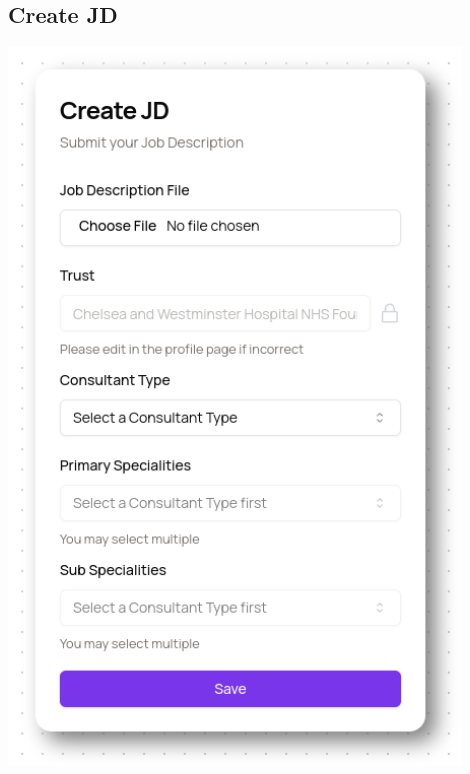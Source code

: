 \begin{appendices}
\subsection{Create JD} \label{app:CreateJD}
\begin{center}
\includegraphics[width=0.9\textwidth]{images/jd-create.png}
\end{center}


\end{appendices}

